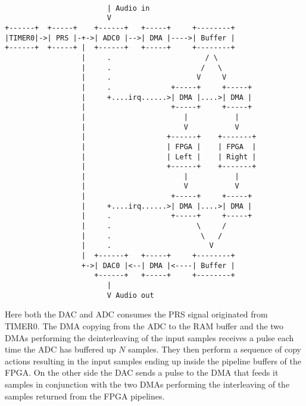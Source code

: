 \begin{verbatim}

                        | Audio in
                        V
+------+  +-----+    +------+   +-----+     +--------+
|TIMER0|->| PRS |-+->| ADC0 |-->| DMA |---->| Buffer |
+------+  +-----+ |  +------+   +-----+     +--------+
                  |     .                      / \
                  |     .                     /   \
                  |     .                    V     V
                  |     .              +-----+     +-----+
                  |     +....irq......>| DMA |....>| DMA |
                  |                    +-----+     +-----+
                  |                       |           |
                  |                       V           V
                  |                   +------+    +-------+
                  |                   | FPGA |    | FPGA  |
                  |                   | Left |    | Right |
                  |                   +------+    +-------+
                  |                       |           |
                  |                       V           V
                  |                    +-----+     +-----+
                  |     +....irq......>| DMA |....>| DMA |
                  |     .              +-----+     +-----+
                  |     .                    \     /
                  |     .                     \   /
                  |     .                       V
                  |  +------+   +-----+     +--------+
                  +->| DAC0 |<--| DMA |<----| Buffer |
                     +------+   +-----+     +--------+
                        |
                        V Audio out
\end{verbatim}

Here both the DAC and ADC consumes the PRS signal originated
from TIMER0. The DMA copying from the ADC to the RAM buffer and
the two DMAs performing the deinterleaving of the input samples
receives a pulse each time the ADC has buffered up $N$ samples.
They then perform a sequence of copy actions resulting in the
input samples ending up inside the pipeline buffers of the FPGA.
On the other side the DAC sends a pulse to the DMA that feeds it
samples in conjunction with the two DMAs performing the
interleaving of the samples returned from the FPGA pipelines.
